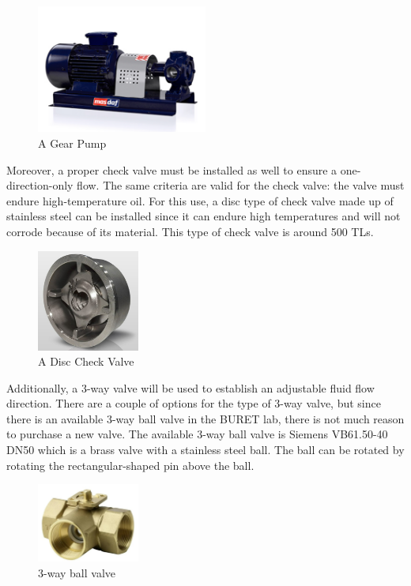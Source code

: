 \begin{figure}[H]
		\centering
		\includegraphics[width=0.5\textwidth]{images/pump.png}
		\caption[A Gear Pump]{A Gear Pump}
		\label{pump} 
\end{figure} 

Moreover, a proper check valve must be installed as well to ensure a one-direction-only flow. The same criteria are valid for the check valve: the valve must endure high-temperature oil. For this use, a disc type of check valve made up of stainless steel can be installed since it can endure high temperatures and will not corrode because of its material. This type of check valve is around 500 TLs.

\begin{figure}[H]
		\centering
		\includegraphics[width=0.3\textwidth]{images/valve_2.png}
		\caption[A Disc Check Valve]{A Disc Check Valve}
		\label{valve_2} 
\end{figure} 

Additionally, a 3-way valve will be used to establish an adjustable fluid flow direction. There are a couple of options for the type of 3-way valve, but since there is an available 3-way ball valve in the BURET lab, there is not much reason to purchase a new valve. The available 3-way ball valve is Siemens VB61.50-40 DN50 which is a brass valve with a stainless steel ball. The ball can be rotated by rotating the rectangular-shaped pin above the ball. 

\begin{figure}[H]
		\centering
		\includegraphics[width=0.3\textwidth]{images/valve.jpg}
		\caption[3-way ball valve]{3-way ball valve}
		\label{valve} 
\end{figure} 

